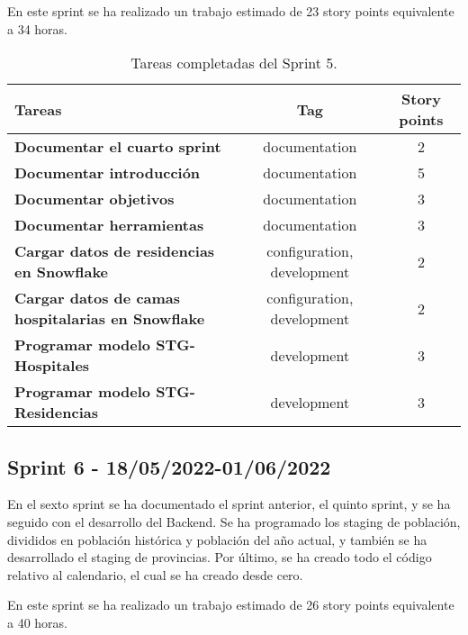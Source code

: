 
En este sprint se ha realizado un trabajo estimado de 23 story points equivalente a 34 horas.

\begin{table}[ht!]
    \centering
    \resizebox{15cm}{!} {
    \begin{tabular}{|l|c|c|}
    \hline
    \textbf{Tareas}     &\textbf{Tag}     & \textbf{Story points} \\ \hline
    \textbf{Documentar el cuarto sprint}         &documentation      &2 \\ \hline 
    \textbf{Documentar introducción}         &documentation      &5 \\ \hline
    \textbf{Documentar objetivos}         &documentation      &3 \\ \hline 
    \textbf{Documentar herramientas}         &documentation      &3 \\ \hline 
    \textbf{Cargar datos de residencias en Snowflake} &configuration, development      &2 \\ \hline 
    \textbf{Cargar datos de camas hospitalarias en Snowflake}         &configuration, development      &2 \\ \hline
    \textbf{Programar modelo STG-Hospitales}         &development      &3 \\ \hline 
    \textbf{Programar modelo STG-Residencias}         &development      &3 \\ \hline 
    \end{tabular}}
    \caption{Tareas completadas del Sprint 5.}
    \label{tab:my_label}
\end{table}

\subsection{Sprint 6 - 18/05/2022-01/06/2022}
En el sexto sprint se ha documentado el sprint anterior, el quinto sprint, y se ha seguido con el desarrollo del Backend. Se ha programado los staging de población, divididos en población histórica y población del año actual, y también se ha desarrollado el staging de provincias. Por último, se ha creado todo el código relativo al calendario, el cual se ha creado desde cero.


En este sprint se ha realizado un trabajo estimado de 26 story points equivalente a 40 horas.

